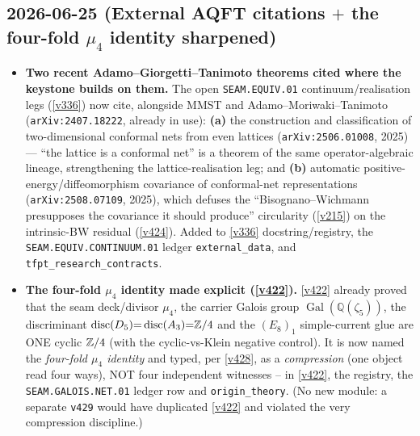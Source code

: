 \subsection*{2026-06-25 (External AQFT citations $+$ the four-fold $\mu_4$ identity sharpened)}
\begin{itemize}
\item \textbf{Two recent Adamo--Giorgetti--Tanimoto theorems cited where the keystone builds on them.}
The open \texttt{SEAM.EQUIV.01} continuum/realisation legs (\vref{v336}) now cite, alongside MMST and
Adamo--Moriwaki--Tanimoto (\texttt{arXiv:2407.18222}, already in use): \textbf{(a)} the construction and
classification of two-dimensional conformal nets from even lattices (\texttt{arXiv:2506.01008}, 2025) ---
``the lattice is a conformal net'' is a theorem of the same operator-algebraic lineage, strengthening the
lattice-realisation leg; and \textbf{(b)} automatic positive-energy/diffeomorphism covariance of conformal-net
representations (\texttt{arXiv:2508.07109}, 2025), which defuses the ``Bisognano--Wichmann presupposes the
covariance it should produce'' circularity (\vref{v215}) on the intrinsic-BW residual (\vref{v424}). Added to
\vref{v336} docstring/registry, the \texttt{SEAM.EQUIV.CONTINUUM.01} ledger \texttt{external\_data}, and
\texttt{tfpt\_research\_contracts}.
\item \textbf{The four-fold $\mu_4$ identity made explicit (\vref{v422}).} \vref{v422} already proved that the
seam deck/divisor $\mu_4$, the carrier Galois group $\operatorname{Gal}(\mathbb Q(\zeta_5))$, the discriminant
$\operatorname{disc}(D_5){=}\operatorname{disc}(A_3){=}\mathbb{Z}/4$ and the $(E_8)_1$ simple-current glue are ONE cyclic
$\mathbb{Z}/4$ (with the cyclic-vs-Klein negative control). It is now named the \emph{four-fold $\mu_4$ identity} and
typed, per \vref{v428}, as a \emph{compression} (one object read four ways), NOT four independent witnesses --
in \vref{v422}, the registry, the \texttt{SEAM.GALOIS.NET.01} ledger row and \texttt{origin\_theory}. (No new
module: a separate \texttt{v429} would have duplicated \vref{v422} and violated the very compression discipline.)
\end{itemize}

